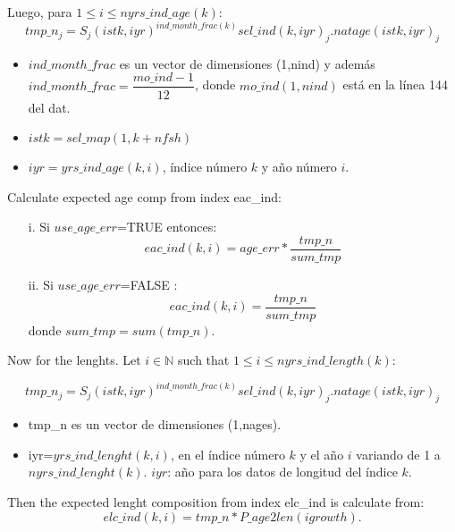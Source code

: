 \documentclass{article}
\begin{document}
Luego, para $1\leq i \leq nyrs\_ind\_age(k)$:
\begin{equation}
    tmp\_n_j= S_j(istk,iyr)^{ind\_month\_frac(k)}sel\_ind(k,iyr)_j.natage(istk,iyr)_j
\end{equation}
\begin{itemize}
    \item $ind\_month\_frac$ es un vector de dimensiones (1,nind) y además $ind\_month\_frac=\dfrac{mo\_ind-1}{12}$, donde $mo\_ind(1,nind)$ está en la línea 144 del dat.
    \item $istk=sel\_map(1,k+nfsh)$
    \item $iyr=yrs\_ind\_age(k,i)$, índice número $k$ y año número $i$.
    \end{itemize}
    
    Calculate expected age comp from index eac\_ind:
    \begin{itemize}
        \item [i.] Si $use\_age\_err$=TRUE entonces: 
    \begin{equation}
        eac\_ind(k,i)=age\_err*\dfrac{tmp\_n}{sum\_tmp}
    \end{equation}
        \item [ii.] Si $use\_age\_err$=FALSE :
        \begin{equation}eac\_ind(k,i)=\dfrac{tmp\_n}{sum\_tmp}
    \end{equation}
    donde $sum\_tmp=sum(tmp\_n)$.
    \end{itemize}
    
    Now for the lenghts. Let $i\in \mathbb{N}$ 
    such that $1\leq i \leq nyrs\_ind\_length(k)$:

\begin{equation}
    tmp\_n_j= S_j(istk,iyr)^{ind\_month\_frac(k)}sel\_ind(k,iyr)_j.natage(istk,iyr)_j
\end{equation}
\begin{itemize}
    \item tmp\_n es un vector de dimensiones (1,nages).
    \item iyr=$yrs\_ind\_lenght(k,i)$, en el índice número $k$ y el año $i$ variando de 1 a $nyrs\_ind\_lenght(k)$. $iyr$: año para los datos de longitud del índice $k$.
    
\end{itemize}
    Then the expected lenght composition from index elc\_ind is calculate from:
    \begin{equation}
    elc\_ind(k,i)=tmp\_n*P\_age2len(igrowth).
\end{equation}
\end{document}

